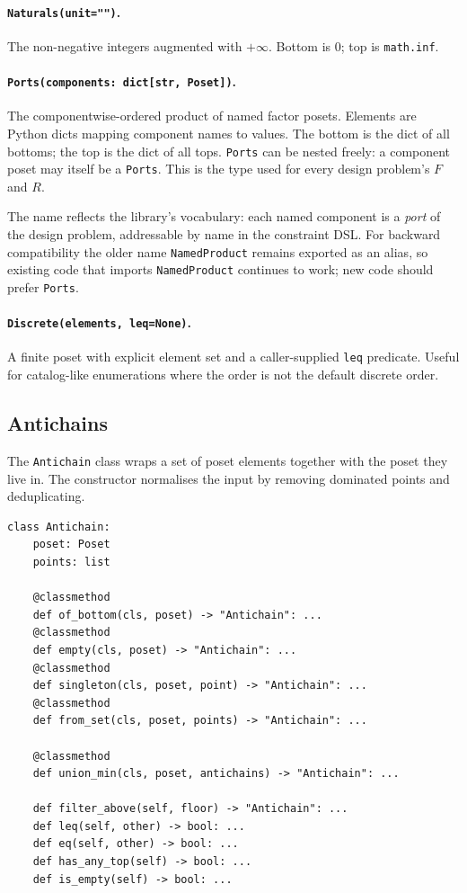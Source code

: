 \documentclass[11pt,a4paper]{article}
\begin{document}
\paragraph{\texttt{Naturals(unit="")}.} The non-negative integers
augmented with $+\infty$. Bottom is $0$; top is \texttt{math.inf}.

\paragraph{\texttt{Ports(components: dict[str, Poset])}.}
The componentwise-ordered product of named factor posets. Elements
are Python dicts mapping component names to values. The bottom is the
dict of all bottoms; the top is the dict of all tops.
\texttt{Ports} can be nested freely: a component poset may
itself be a \texttt{Ports}. This is the type used for every design
problem's $F$ and $R$.

The name reflects the library's vocabulary: each named component is
a \emph{port} of the design problem, addressable by name in the
constraint DSL. For backward compatibility the older name
\texttt{NamedProduct} remains exported as an alias, so existing code
that imports \texttt{NamedProduct} continues to work; new code should
prefer \texttt{Ports}.

\paragraph{\texttt{Discrete(elements, leq=None)}.} A finite poset with
explicit element set and a caller-supplied \texttt{leq} predicate.
Useful for catalog-like enumerations where the order is not the
default discrete order.

\subsection{Antichains}

The \texttt{Antichain} class wraps a set of poset elements together
with the poset they live in. The constructor normalises the input by
removing dominated points and deduplicating.

\begin{lstlisting}
class Antichain:
    poset: Poset
    points: list

    @classmethod
    def of_bottom(cls, poset) -> "Antichain": ...
    @classmethod
    def empty(cls, poset) -> "Antichain": ...
    @classmethod
    def singleton(cls, poset, point) -> "Antichain": ...
    @classmethod
    def from_set(cls, poset, points) -> "Antichain": ...

    @classmethod
    def union_min(cls, poset, antichains) -> "Antichain": ...

    def filter_above(self, floor) -> "Antichain": ...
    def leq(self, other) -> bool: ...
    def eq(self, other) -> bool: ...
    def has_any_top(self) -> bool: ...
    def is_empty(self) -> bool: ...
\end{lstlisting}
\end{document}
